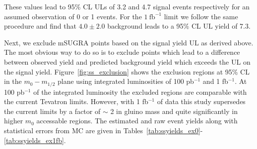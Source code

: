 These values lead to  95\% CL  ULs  of 3.2 and 4.7  signal  events respectively for an assumed 
observation of 0 or 1 events. For the $1~\mathrm{fb}^{-1}$ limit we follow the same procedure
and find that $4.0 \pm 2.0$ background leads to a 95\% CL UL yield of 7.3.

Next, we  exclude mSUGRA  points based on the  signal yield UL as derived above. The most 
obvious  way to do  so is to  exclude points which  lead  to a  difference  between  
observed  yield and  predicted background yield  which exceeds the  UL on the signal  yield. 
Figure~\ref{fig:ss_exclusion} shows the exclusion regions at 
95\% CL in the $m_{0}-m_{1/2}$ plane using integrated luminosities of 100 pb$^{-1}$
and 1 fb$^{-1}$. At 100 pb$^{-1}$ of the integrated luminosity the excluded 
regions are comparable with the current Tevatron limits. However, with 1 fb$^{-1}$
of data this study supersedes the current limits by a factor of $\sim$ 2 in gluino 
mass and quite significantly in higher $m_{0}$ accessable regions. The estimated and raw 
event yields along with statistical errors from MC are given in 
Tables~\ref{tab:ssyields_ex0}-\ref{tab:ssyields_ex1fb}.



